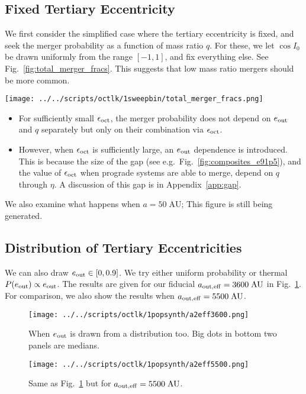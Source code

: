 \documentclass[
        fleqn,
        usenatbib,
    ]{mnras}
\begin{document}
\subsection{Fixed Tertiary Eccentricity}

We first consider the simplified case where the tertiary eccentricity is fixed,
and seek the merger probability as a function of mass ratio $q$. For these, we
let $\cos I_0$ be drawn uniformly from the range $[-1, 1]$, and fix everything
else. See Fig.~\ref{fig:total_merger_fracs}. This suggests that low mass ratio
mergers should be more common.
\begin{figure*}
    \centering
    \texttt{[image: ../../scripts/octlk/1sweepbin/total\_merger\_fracs.png]}
    \caption{Merger probability for fixed tertiary eccentricity as a function of
    mass ratio, fiducial params. Dotted lines represent the prediction using the
    GW-free criteria. }\label{fig:total_merger_fracs}
\end{figure*}
\begin{itemize}
    \item For sufficiently small $\epsilon_{\rm oct}$, the merger probability
        does not depend on $e_{\rm out}$ and $q$ separately but only on their
        combination via $\epsilon_{\rm oct}$.

    \item However, when $\epsilon_{\rm oct}$ is sufficiently large, an $e_{\rm
        out}$ dependence is introduced. This is because the size of the gap (see
        e.g.\ Fig.~\ref{fig:composites_e91p5}), and the value of $\epsilon_{\rm
        oct}$ when prograde systems are able to merge, depend on $q$ through
        $\eta$. A discussion of this gap is in Appendix~\ref{app:gap}.
\end{itemize}

We also examine what happens when $a = 50\;\mathrm{AU}$; \textcolor{Corr}{This
figure is still being generated}.

\subsection{Distribution of Tertiary Eccentricities}

We can also draw $e_{\rm out} \in [0, 0.9]$. We try either uniform probability
or thermal $P(e_{\rm out}) \propto e_{\rm out}$. The results are given for our
fiducial $a_{\rm out, eff} = 3600\;\mathrm{AU}$ in Fig.~\ref{fig:popsynth}. For
comparison, we also show the results when $a_{\rm out, eff} =
5500\;\mathrm{AU}$.
\begin{figure}
    \centering
    \texttt{[image: ../../scripts/octlk/1popsynth/a2eff3600.png]}
    \caption{When $e_{\rm out}$ is drawn from a distribution too. Big dots in
    bottom two panels are medians. }\label{fig:popsynth}
\end{figure}
\begin{figure}
    \centering
    \texttt{[image: ../../scripts/octlk/1popsynth/a2eff5500.png]}
    \caption{Same as Fig.~\ref{fig:popsynth} but for $a_{\rm out, eff} =
    5500\;\mathrm{AU}$. }\label{fig:popsynth5500}
\end{figure}
\end{document}
